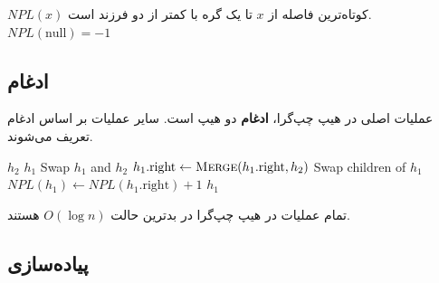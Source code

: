 \documentclass{matinbook}
\begin{document}
    \begin{definition}[NPL]
        $NPL(x)$ کوتاه‌ترین فاصله از $x$
        تا یک گره با کمتر از دو فرزند است.
        $NPL(\text{null}) = -1$
        \label{def:npl}
    \end{definition}
    
    \subsection{ادغام}
    
    عملیات اصلی در هیپ چپ‌گرا،
    \textbf{ادغام} دو هیپ است.
    سایر عملیات بر اساس ادغام تعریف می‌شوند.
    
    \begin{latin}
        \begin{algorithm}
            \begin{algorithmic}[1]
                \State \Return $h_{2}$
                \EndIf
                \State \Return $h_{1}$
                \EndIf
                \State Swap $h_{1}$ and $h_{2}$
                \EndIf
                \State $h_{1}.\text{right} \gets
                \Call{Merge}{h_{1}.\text{right}, h_{2}}$
                \State Swap children of $h_{1}$
                \EndIf
                \State $NPL(h_{1}) \gets NPL(h_{1}.\text{right}) + 1$
                \State \Return $h_{1}$
                \EndFunction
            \end{algorithmic}
        \end{algorithm}
    \end{latin}
    
    \begin{theorem}
        تمام عملیات در هیپ چپ‌گرا
        در بدترین حالت $O(\log n)$ هستند.
        \label{thm:leftist-complexity}
    \end{theorem}
    
    \subsection{پیاده‌سازی}
    
\end{document}
